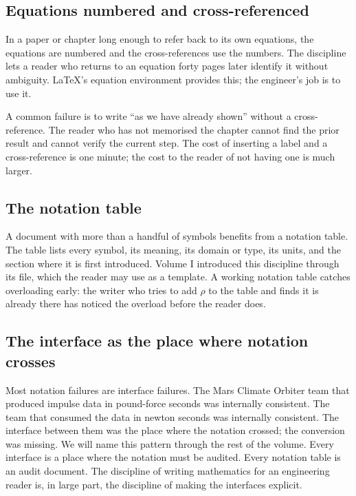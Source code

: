 \subsection{Equations numbered and cross-referenced}

In a paper or chapter long enough to refer back to its own
equations, the equations are numbered and the cross-references use
the numbers. The discipline lets a reader who returns to an equation
forty pages later identify it without ambiguity. LaTeX's equation
environment provides this; the engineer's job is to use it.

A common failure is to write ``as we have already shown'' without a
cross-reference. The reader who has not memorised the chapter cannot
find the prior result and cannot verify the current step. The cost
of inserting a label and a cross-reference is one minute; the cost
to the reader of not having one is much larger.

\subsection{The notation table}

A document with more than a handful of symbols benefits from a
notation table. The table lists every symbol, its meaning, its
domain or type, its units, and the section where it is first
introduced. Volume I introduced this discipline through its
 file, which the reader may use
as a template. A working notation table catches overloading early:
the writer who tries to add $\rho$ to the table and finds it is
already there has noticed the overload before the reader does.

\subsection{The interface as the place where notation crosses}

Most notation failures are interface failures. The Mars Climate
Orbiter team that produced impulse data in pound-force seconds was
internally consistent. The team that consumed the data in newton
seconds was internally consistent. The interface between them was
the place where the notation crossed; the conversion was missing.
We will name this pattern through the rest of the volume. Every
interface is a place where the notation must be audited. Every
notation table is an audit document. The discipline of writing
mathematics for an engineering reader is, in large part, the
discipline of making the interfaces explicit.

